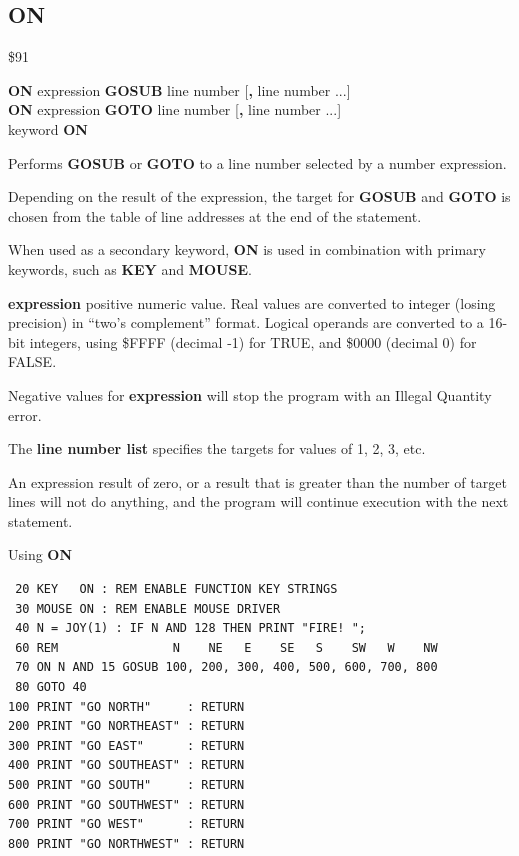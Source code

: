 \subsection{ON}
\begin{description}[leftmargin=2cm,style=nextline]
\item [Token:]    \$91

\item [Format:]   {\bf ON} expression {\bf GOSUB} line number [{\bf,} line number ...] \\
                  {\bf ON} expression {\bf GOTO} line number [{\bf,} line number ...] \\
                  keyword {\bf ON}

\item [Usage:]    Performs {\bf GOSUB} or {\bf GOTO} to a line number selected by a number expression.

                  Depending on the result of the expression, the target for {\bf GOSUB} and {\bf GOTO} is chosen from the table of line addresses at the end of the statement.

                  When used as a secondary keyword, {\bf ON} is used in combination with primary keywords, such as {\bf KEY} and {\bf MOUSE}.

                  {\bf expression} positive numeric value. Real values are converted to integer (losing precision) in ``two's complement'' format. Logical operands are converted to a 16-bit integers, using \$FFFF (decimal -1) for TRUE, and \$0000 (decimal 0) for FALSE.

\item [Remarks:]  Negative values for {\bf expression} will stop the program with an Illegal Quantity error.

                  The {\bf line number list} specifies the targets for values of 1, 2, 3, etc.

                  An expression result of zero, or a result that is greater than the number of target lines will not do anything, and the program will continue execution with the next statement.

\item [Example:]  Using {\bf ON}

\begin{tcolorbox}[colback=black,coltext=white]
\verbatimfont{\codefont}
\begin{verbatim}
 20 KEY   ON : REM ENABLE FUNCTION KEY STRINGS
 30 MOUSE ON : REM ENABLE MOUSE DRIVER
 40 N = JOY(1) : IF N AND 128 THEN PRINT "FIRE! ";
 60 REM                N    NE   E    SE   S    SW   W    NW
 70 ON N AND 15 GOSUB 100, 200, 300, 400, 500, 600, 700, 800
 80 GOTO 40
100 PRINT "GO NORTH"     : RETURN
200 PRINT "GO NORTHEAST" : RETURN
300 PRINT "GO EAST"      : RETURN
400 PRINT "GO SOUTHEAST" : RETURN
500 PRINT "GO SOUTH"     : RETURN
600 PRINT "GO SOUTHWEST" : RETURN
700 PRINT "GO WEST"      : RETURN
800 PRINT "GO NORTHWEST" : RETURN
\end{verbatim}
\end{tcolorbox}
\end{description}

